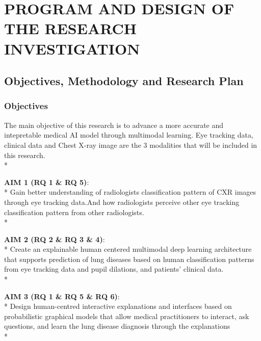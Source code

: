 \section{PROGRAM AND DESIGN OF THE RESEARCH INVESTIGATION}
\label{sec:research-design}

\subsection{Objectives, Methodology and Research Plan}

\subsubsection{Objectives}
The main objective of this research is to advance a more accurate and intepretable medical AI model through multimodal learning. Eye tracking data, clinical data and Chest X-ray image are the 3 modalities that will be included in this research.\\*

\noindent
\textbf{AIM 1 (RQ 1 \& RQ 5)}:\\*
Gain better understanding of radiologists classification pattern of CXR images through eye tracking data.And how radiologists perceive other eye tracking classification pattern from other radiologists. \\* 

\noindent
\textbf{AIM 2 (RQ 2 \& RQ 3 \& 4)}:\\*
 Create an explainable human centered multimodal deep learning architecture that supports prediction of lung diseases based on human classification patterns from eye tracking data and pupil dilations, and patients' clinical data.\\*


\noindent
\textbf{AIM 3 (RQ 1 \& RQ 5 \& RQ 6)}:\\*
Design human-centred interactive explanations and interfaces based on probabilistic graphical models that allow medical practitioners to interact, ask questions, and learn the lung disease diagnosis through the explanations \\*

